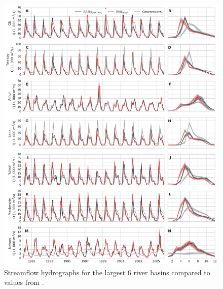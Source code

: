 \documentclass[jgrga, draft]{agutex}
\begin{document}
\clearpage
\begin{figure}
\noindent\includegraphics[width=40pc,natwidth=1]{R1010RBRbaaa01a_rvicfast_hydrographs}
\caption{Streamflow hydrographs for the largest 6 river basins compared to values from \citet{Dai_2009}.}
\label{fig:hydrographs}
\end{figure}
\end{document}
